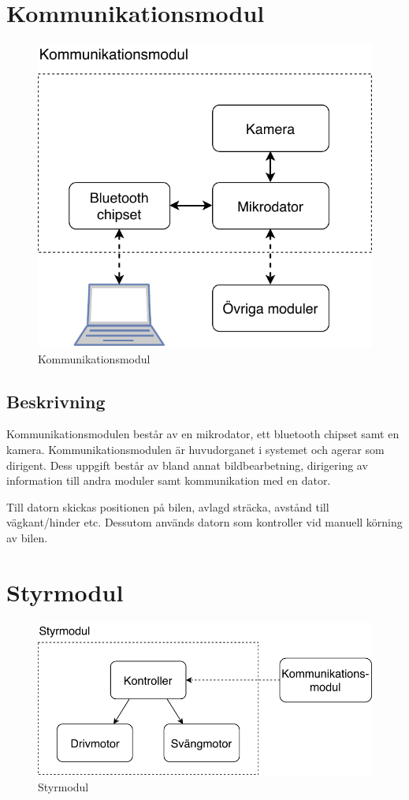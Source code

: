 \documentclass[kravspec/krav.tex]{subfiles}
\begin{document}
\clearpage
\section{Kommunikationsmodul}
\begin{figure}[H]
    \centering
    \includegraphics[width=0.6\linewidth]{kravspec/figures/kommunikationsmodul.pdf}
    \caption{Kommunikationsmodul}
    \label{fig:kommunikationsmodul}
\end{figure}
\subsection{Beskrivning}
Kommunikationsmodulen består av en mikrodator, ett bluetooth chipset samt en
kamera. Kommunikationsmodulen är huvudorganet i systemet och agerar som
dirigent. Dess uppgift består av bland annat bildbearbetning, dirigering av
information till andra moduler samt kommunikation med en dator.

Till datorn skickas positionen på bilen, avlagd sträcka, avstånd till
vägkant/hinder etc. Dessutom används datorn som kontroller vid manuell körning
av bilen.

\clearpage
\section{Styrmodul}
\begin{figure}[h]
    \centering
    \includegraphics[width=0.6\linewidth]{kravspec/figures/styrmodul.pdf}
    \caption{Styrmodul}
    \label{fig:styrmodul}
\end{figure}
\end{document}
